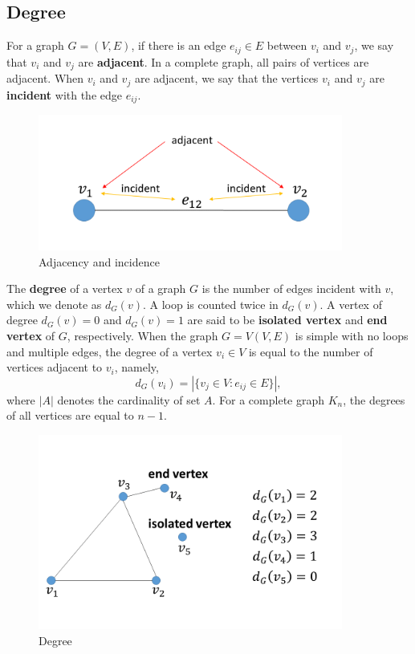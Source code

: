 \documentclass[10.5pt, A4paper, openany, uplatex]{book}
\numberwithin{equation}{section}
\begin{document}
\begin{appendices}
	\section{Degree}
	
	For a graph $G = (V, E)$, if there is an edge $e_{ij} \in E$ between $v_i$ and $v_j$, we say that $v_i$ and $v_j$ are \textbf{adjacent}.
	In a complete graph, all pairs of vertices are adjacent.
	When $v_i$ and $v_j$ are adjacent, we say that the vertices $v_i$ and  $v_j$ are \textbf{incident} with the edge $e_{ij}$.
	
	\begin{figure}[h!]
		\begin{center}
			\includegraphics[width = 10cm]{adjacent.png}
			\caption{Adjacency and incidence\label{fig:adjacency}}
		\end{center}
	\end{figure}
	
	The \textbf{degree} of a vertex $v$ of a graph $G$ is the number of edges incident with $v$, which we denote as $d_G(v)$.
	A loop is counted twice in $d_G(v)$.
	A vertex of degree $d_G(v) = 0$ and $d_G(v) = 1$ are said to be \textbf{isolated vertex} and \textbf{end vertex} of $G$, respectively.
	When the graph $G = V(V, E)$ is simple with no loops and multiple edges, the degree of a vertex $v_i \in V$ is equal to the number of vertices adjacent to $v_i$, namely,
	\[
		d_G(v_i) = | \{v_j \in V : e_{ij}\in E\} |,
	\]
	where $| A |$ denotes the cardinality of set $A$.
	For a complete graph $K_n$, the degrees of all vertices are equal to $n - 1$.
	
	\begin{figure}[h!]
		\begin{center}
			\includegraphics[width = 10cm]{degree.png}
			\caption{Degree\label{fig:degree}}
		\end{center}
	\end{figure}
	

\end{appendices}
\end{document}
